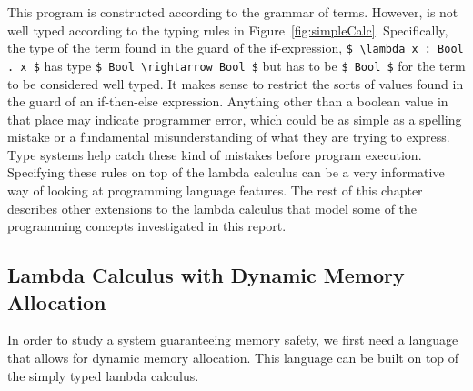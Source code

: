 This program is constructed according to the grammar of terms. However, is not
well typed according to the typing rules in Figure~\ref{fig:simpleCalc}.
 Specifically, the type of the term found in the guard
of the if-expression, \lstinline[mathescape]{$ \lambda x : Bool . x $} has type
\lstinline[mathescape]{$ Bool \rightarrow Bool $} but has to be
\lstinline[mathescape]{$ Bool $} for the term to be considered well typed.  It
makes sense to restrict the sorts of values found in the guard of an
if-then-else expression. Anything other than a boolean value in that place may
indicate programmer error, which could be as simple as a spelling mistake or a
fundamental misunderstanding of what they are trying to express. Type systems
help catch these kind of mistakes before program execution. Specifying these
rules on top of the lambda calculus can be a very informative way of looking at
programming language features. The rest of this chapter describes other
extensions to the lambda calculus that model some of the programming concepts
investigated in this report.

\subsection{Lambda Calculus with Dynamic Memory Allocation}
In order to study a system guaranteeing memory safety, we first need a language
that allows for dynamic memory allocation. This language can be built on top of
the simply typed lambda calculus. 

